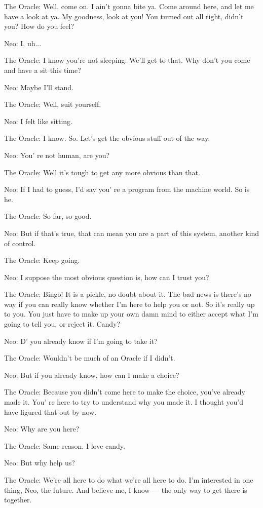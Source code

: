 \documentclass[UTF8]{ctexart}
\newenvironment{myquote}{\color{green} \setlength{\leftskip}{6em} \setlength{\rightskip}{4em} \setlength{\parindent}{-2em}}{\par}
\begin{document}
\begin{myquote}
The Oracle: Well, come on. I ain't gonna bite ya. Come around here, and let me have a look at ya. My goodness, look at you! You turned out all right, didn't you? How do you feel?

Neo: I, uh...

The Oracle: I know you're not sleeping. We'll get to that. Why don't you come and have a sit this time?

Neo: Maybe I'll stand.

The Oracle: Well, suit yourself.

Neo: I felt like sitting.

The Oracle: I know. So. Let's get the obvious stuff out of the way.

Neo: You' re not human, are you?

The Oracle: Well it's tough to get any more obvious than that.

Neo: If I had to guess, I'd say you' re a program from the machine world. So is he.

The Oracle: So far, so good.

Neo: But if that's true, that can mean you are a part of this system, another kind of control.

The Oracle: Keep going.

Neo: I suppose the most obvious question is, how can I trust you?

The Oracle: Bingo! It is a pickle, no doubt about it. The bad news is there's no way if you can really know whether I'm here to help you or not. So it's really up to you. You just have to make up your own damn mind to either accept what I'm going to tell you, or reject it. Candy?

Neo: D' you already know if I'm going to take it?

The Oracle: Wouldn't be much of an Oracle if I didn't.

Neo: But if you already know, how can I make a choice?

The Oracle: Because you didn't come here to make the choice, you've already made it. You' re here to try to understand why you made it. I thought you'd have figured that out by now.

Neo: Why are you here?

The Oracle: Same reason. I love candy.

Neo: But why help us?

The Oracle: We're all here to do what we're all here to do. I'm interested in one thing, Neo, the future. And believe me, I know --- the only way to get there is together.


\end{myquote}
\end{document}
